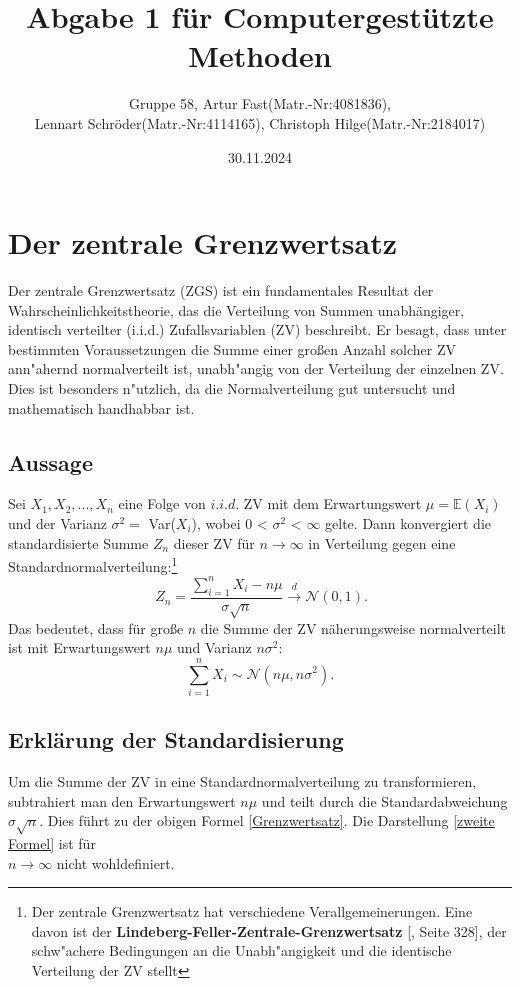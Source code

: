 \documentclass{article}
\title{Abgabe 1 für Computergestützte Methoden}
\author{Gruppe 58, Artur Fast(Matr.-Nr:4081836),\\
Lennart Schröder(Matr.-Nr:4114165), Christoph Hilge(Matr.-Nr:2184017)}
\date{30.11.2024}
\begin{document}
\maketitle



\tableofcontents

\newpage

\section{Der zentrale Grenzwertsatz}
Der zentrale Grenzwertsatz (ZGS) ist ein fundamentales Resultat der Wahrscheinlichkeitstheorie, das die Verteilung von Summen unabhängiger, identisch verteilter (i.i.d.) Zufallsvariablen (ZV) beschreibt. Er besagt, dass unter bestimmten Voraussetzungen die Summe einer großen Anzahl solcher ZV ann"ahernd normalverteilt ist, unabh"angig von der Verteilung der einzelnen ZV. Dies ist besonders n"utzlich, da die Normalverteilung gut untersucht und mathematisch
handhabbar ist.


\subsection{Aussage}
Sei $X_1,X_2,...,X_n$ eine Folge von $i.i.d.$ ZV mit dem Erwartungswert $\mu = \mathbb{E}(X_i)$ und der Varianz $\sigma^2 =$ Var($X_i$), wobei 0 < $\sigma^2$ < $\infty$ gelte. Dann konvergiert die standardisierte Summe $Z_n$ dieser ZV für $n \to \infty$ in Verteilung gegen eine Standardnormalverteilung:\footnote{Der zentrale Grenzwertsatz hat verschiedene Verallgemeinerungen. Eine davon ist der \textbf{Lindeberg-Feller-Zentrale-Grenzwertsatz} [\cite{klenke}, Seite 328], der schw"achere Bedingungen an die Unabh"angigkeit und die identische Verteilung der ZV stellt}
\begin{equation}
    \label{Grenzwertsatz}
    \ Z_n = {\frac{\sum_{i=1}^{n}X_i-n\mu}{\sigma \sqrt{n}}} \xrightarrow{d} \mathcal{N}(0,1).
\end{equation}
Das bedeutet, dass für große $n$ die Summe der ZV näherungsweise normalverteilt ist mit Erwartungswert $n\mu$ und Varianz $n\sigma^2$:
\begin{equation}
\label{zweite Formel}
\sum_{i=1}^{n}X_i\sim \mathcal{N}(n\mu,n\sigma^2).
\end{equation}

\subsection{Erklärung der Standardisierung}
Um die Summe der ZV in eine Standardnormalverteilung zu transformieren, subtrahiert man den Erwartungswert $n\mu$ und teilt durch die Standardabweichung $\sigma\sqrt{n}$. Dies führt zu der obigen Formel \eqref{Grenzwertsatz}. Die Darstellung \eqref{zweite Formel} ist für\\ $n\xrightarrow{}\infty$ nicht wohldefiniert.
\end{document}
